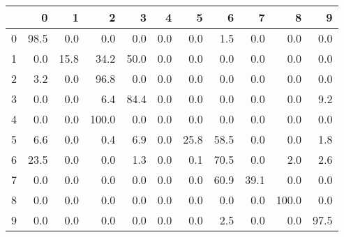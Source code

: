 \begin{tabular}{lrrrrrrrrrr}
\toprule
{} &     0 &     1 &      2 &     3 &    4 &     5 &     6 &     7 &      8 &     9 \\
\midrule
0 &  98.5 &   0.0 &    0.0 &   0.0 &  0.0 &   0.0 &   1.5 &   0.0 &    0.0 &   0.0 \\
1 &   0.0 &  15.8 &   34.2 &  50.0 &  0.0 &   0.0 &   0.0 &   0.0 &    0.0 &   0.0 \\
2 &   3.2 &   0.0 &   96.8 &   0.0 &  0.0 &   0.0 &   0.0 &   0.0 &    0.0 &   0.0 \\
3 &   0.0 &   0.0 &    6.4 &  84.4 &  0.0 &   0.0 &   0.0 &   0.0 &    0.0 &   9.2 \\
4 &   0.0 &   0.0 &  100.0 &   0.0 &  0.0 &   0.0 &   0.0 &   0.0 &    0.0 &   0.0 \\
5 &   6.6 &   0.0 &    0.4 &   6.9 &  0.0 &  25.8 &  58.5 &   0.0 &    0.0 &   1.8 \\
6 &  23.5 &   0.0 &    0.0 &   1.3 &  0.0 &   0.1 &  70.5 &   0.0 &    2.0 &   2.6 \\
7 &   0.0 &   0.0 &    0.0 &   0.0 &  0.0 &   0.0 &  60.9 &  39.1 &    0.0 &   0.0 \\
8 &   0.0 &   0.0 &    0.0 &   0.0 &  0.0 &   0.0 &   0.0 &   0.0 &  100.0 &   0.0 \\
9 &   0.0 &   0.0 &    0.0 &   0.0 &  0.0 &   0.0 &   2.5 &   0.0 &    0.0 &  97.5 \\
\bottomrule
\end{tabular}
